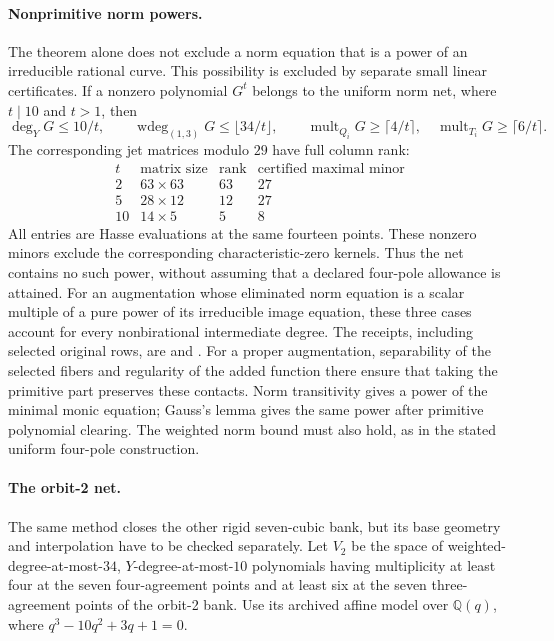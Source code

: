 \paragraph{Nonprimitive norm powers.}
The theorem alone does not exclude a norm equation that is a power
of an irreducible rational curve. This possibility is excluded by separate
small linear certificates. If a nonzero polynomial $G^t$ belongs to the
uniform norm net, where $t\mid10$ and $t>1$, then
\[
 \deg_YG\le10/t,\qquad \operatorname{wdeg}_{(1,3)}G\le\lfloor34/t\rfloor,
 \qquad \operatorname{mult}_{Q_i}G\ge\lceil4/t\rceil,
 \quad \operatorname{mult}_{T_i}G\ge\lceil6/t\rceil.
\]
The corresponding jet matrices modulo $29$ have full column rank:
\[
\begin{array}{c|c|c|c}
 t&\text{matrix size}&\text{rank}&\text{certified maximal minor}\\\hline
 2&63\mathbin{\times}63&63&27\\
 5&28\mathbin{\times}12&12&27\\
 10&14\mathbin{\times}5&5&8
\end{array}
\]
All entries are Hasse evaluations at the same fourteen points. These
nonzero minors exclude the corresponding characteristic-zero kernels.
Thus the net contains no such power, without assuming that a declared
four-pole allowance is attained. For an augmentation whose eliminated
norm equation is a scalar multiple of a pure power of its irreducible
image equation, these three cases account for every nonbirational
intermediate degree. The receipts, including selected original rows,
are  and
.
For a proper augmentation, separability of the selected fibers and
regularity of the added function there ensure that taking the primitive
part preserves these contacts. Norm transitivity gives a power of the
minimal monic equation; Gauss's lemma gives the same power after primitive
polynomial clearing. The weighted norm bound must also hold, as in the
stated uniform four-pole construction.

\paragraph{The orbit-2 net.}
The same method closes the other rigid seven-cubic bank, but its base
geometry and interpolation have to be checked separately. Let $V_2$ be
the space of weighted-degree-at-most-$34$, $Y$-degree-at-most-$10$
polynomials having multiplicity at least four at the seven
four-agreement points and at least six at the seven three-agreement
points of the orbit-2 bank. Use its archived affine model over
$\mathbb Q(q)$, where $q^3-10q^2+3q+1=0$.

